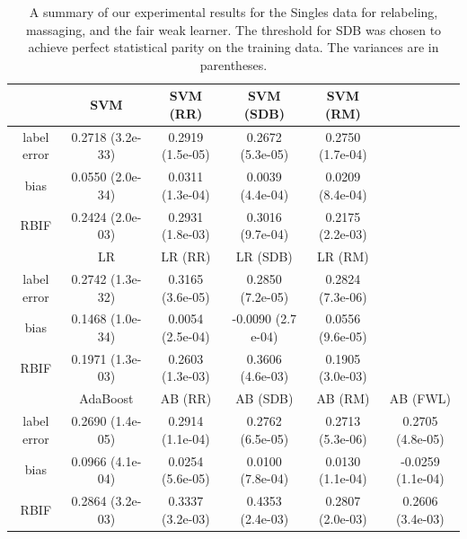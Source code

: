 \documentclass[conference]{IEEEtran}
\begin{document}
\begin{table}
\centering
\begin{tabular}{| c | ccccc |}
\hline
               & SVM & SVM (RR) & SVM (SDB) & SVM (RM) & \\
\hline 
label error    & 0.2718 (3.2e-33)& 0.2919 (1.5e-05)   & 0.2672 (5.3e-05) & 0.2750 (1.7e-04) & \\ 
bias           &0.0550 (2.0e-34)& 0.0311 (1.3e-04)  & 0.0039 (4.4e-04) & 0.0209 (8.4e-04) & \\ 
RBIF           &0.2424 (2.0e-03)& 0.2931 (1.8e-03) & 0.3016 (9.7e-04) & 0.2175 (2.2e-03)  &\\ 
\hline
               & LR & LR (RR) & LR (SDB) & LR (RM) &  \\
\hline 
label error    & 0.2742 (1.3e-32)  & 0.3165 (3.6e-05) & 0.2850 (7.2e-05)& 0.2824 (7.3e-06)&\\ 
bias           & 0.1468 (1.0e-34)  & 0.0054 (2.5e-04)  & -0.0090 (2.7 e-04) & 0.0556 (9.6e-05) &\\ 
RBIF           & 0.1971 (1.3e-03) & 0.2603 (1.3e-03)  & 0.3606 (4.6e-03) & 0.1905 (3.0e-03) & \\ 
\hline
               & AdaBoost & AB (RR)  & AB (SDB)  & AB (RM)   & AB (FWL)  \\
\hline 
label error    & 0.2690 (1.4e-05)  &0.2914 (1.1e-04)  & 0.2762 (6.5e-05) & 0.2713 (5.3e-06) & 0.2705 (4.8e-05)\\ 
bias           & 0.0966 (4.1e-04)  & 0.0254 (5.6e-05) & 0.0100 (7.8e-04) & 0.0130 (1.1e-04) & -0.0259 (1.1e-04)  \\ 
RBIF           & 0.2864 (3.2e-03)   &0.3337 (3.2e-03) & 0.4353 (2.4e-03) & 0.2807 (2.0e-03) & 0.2606 (3.4e-03) \\ 
\hline
\hline 
\end{tabular}
\caption{A summary of our experimental results for the Singles data for relabeling, massaging, and
the fair weak learner. The threshold for SDB was chosen to achieve perfect
statistical parity on the training data.  The variances are in parentheses.}
\label{table:singles_results}
\end{table}

\clearpage
\end{document}

